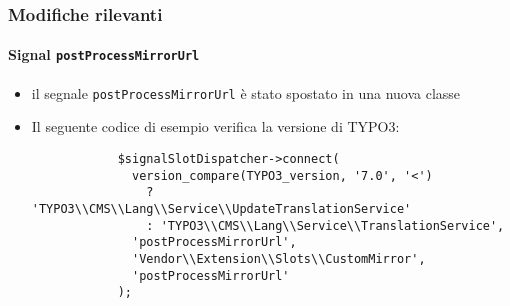 \begin{frame}[fragile]
	\frametitle{Modifiche rilevanti}
	\framesubtitle{Signal \texttt{postProcessMirrorUrl}}

	\lstset{basicstyle=\tiny\ttfamily}

	\begin{itemize}

		\item il segnale \texttt{postProcessMirrorUrl} è stato spostato in una nuova classe

		\breakingchange

		\item Il seguente codice di esempio verifica la versione di TYPO3:

		\begin{lstlisting}
			$signalSlotDispatcher->connect(
			  version_compare(TYPO3_version, '7.0', '<')
			    ? 'TYPO3\\CMS\\Lang\\Service\\UpdateTranslationService'
			    : 'TYPO3\\CMS\\Lang\\Service\\TranslationService',
			  'postProcessMirrorUrl',
			  'Vendor\\Extension\\Slots\\CustomMirror',
			  'postProcessMirrorUrl'
			);
		\end{lstlisting}

	\end{itemize}

\end{frame}

